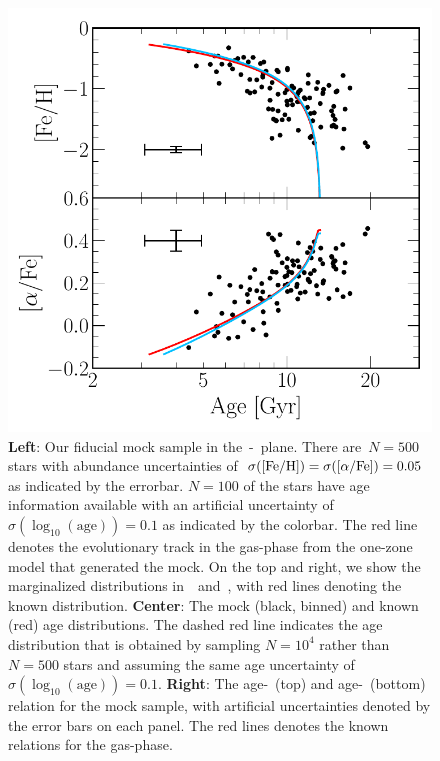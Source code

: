 \documentclass[ms.tex]{subfiles}
\begin{document}
\begin{figure}
\includegraphics[scale = 0.42]{fiducial_mock_amr.pdf}
\caption{
\textbf{Left}: Our fiducial mock sample in the~\afe-\feh~plane.
There are~$N = 500$ stars with abundance uncertainties
of~$\sigma(\text{[Fe/H]}) = \sigma(\text{[$\alpha$/Fe]}) = 0.05$ as indicated by the errorbar.
$N = 100$ of the stars have age information available with an artificial
uncertainty of~$\sigma(\log_{10}(\text{age})) = 0.1$ as indicated by the
colorbar.
The red line denotes the evolutionary track in the gas-phase from the one-zone
model that generated the mock.
On the top and right, we show the marginalized distributions
in~\afe~and~\feh, with red lines denoting the known distribution.
\textbf{Center}: The mock (black, binned) and known (red) age distributions.
The dashed red line indicates the age distribution that is obtained by sampling
$N = 10^4$ rather than $N = 500$ stars and assuming the same age uncertainty
of~$\sigma(\log_{10}(\text{age})) = 0.1$.
\textbf{Right}: The age-\feh~(top) and age-\afe~(bottom) relation for the mock
sample, with artificial uncertainties denoted by the error bars on each panel.
The red lines denotes the known relations for the gas-phase.
}
\label{fig:fiducialmock}
\end{figure}
\end{document}
